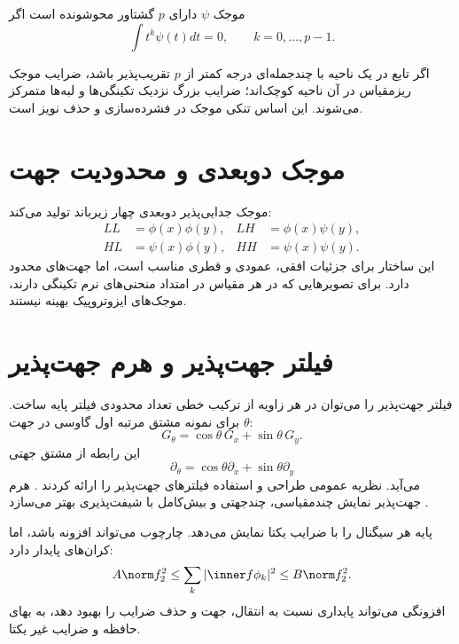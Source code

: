 \begin{definition}
موجک \(\psi\) دارای \(p\) گشتاور محوشونده است اگر
\begin{equation}
\int t^k\psi(t)dt=0,
\qquad k=0,\dots,p-1.
\end{equation}
\end{definition}

اگر تابع در یک ناحیه با چندجمله‌ای درجه کمتر از \(p\) تقریب‌پذیر باشد، ضرایب موجک ریزمقیاس در آن ناحیه
کوچک‌اند؛ ضرایب بزرگ نزدیک تکینگی‌ها و لبه‌ها متمرکز می‌شوند. این اساس تنکی موجک در فشرده‌سازی و حذف
نویز است.

\section{موجک دوبعدی و محدودیت جهت}

موجک جدایی‌پذیر دوبعدی چهار زیرباند تولید می‌کند:
\begin{align}
LL&=\phi(x)\phi(y),&
LH&=\phi(x)\psi(y),\\
HL&=\psi(x)\phi(y),&
HH&=\psi(x)\psi(y).
\end{align}
این ساختار برای جزئیات افقی، عمودی و قطری مناسب است، اما جهت‌های محدود دارد. برای تصویرهایی که در هر
مقیاس در امتداد منحنی‌های نرم تکینگی دارند، موجک‌های ایزوتروپیک بهینه نیستند.

\section{فیلتر جهت‌پذیر و هرم جهت‌پذیر}

فیلتر جهت‌پذیر را می‌توان در هر زاویه از ترکیب خطی تعداد محدودی فیلتر پایه ساخت. برای نمونه مشتق مرتبه اول
گاوسی در جهت \(\theta\):
\begin{equation}
G_\theta=\cos\theta\,G_x+\sin\theta\,G_y.
\label{eq:steer-first}
\end{equation}
این رابطه از مشتق جهتی
\begin{equation}
\partial_\theta=\cos\theta\partial_x+\sin\theta\partial_y
\end{equation}
می‌آید.  نظریه عمومی طراحی و استفاده فیلترهای جهت‌پذیر را ارائه کردند
\cite{freeman1991steerable}. هرم جهت‌پذیر  نمایش چندمقیاسی، چندجهتی و بیش‌کامل با
شیفت‌پذیری بهتر می‌سازد \cite{simoncelli1992shiftable,simoncelli1995pyramid}.

\begin{keybox}
پایه هر سیگنال را با ضرایب یکتا نمایش می‌دهد. چارچوب می‌تواند افزونه باشد، اما کران‌های پایدار دارد:
\begin{equation}
A\norm f_2^2\le\sum_k|\inner f{\phi_k}|^2\le B\norm f_2^2.
\end{equation}
افزونگی می‌تواند پایداری نسبت به انتقال، جهت و حذف ضرایب را بهبود دهد، به بهای حافظه و ضرایب غیر یکتا.
\end{keybox}

